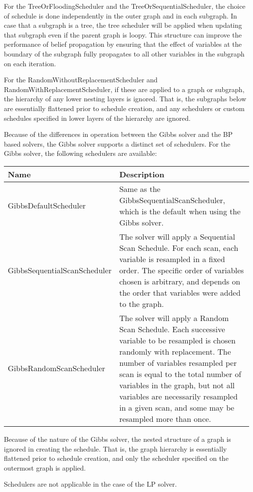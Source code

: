 For the TreeOrFloodingScheduler and the TreeOrSequentialScheduler, the choice of schedule is done independently in the outer graph and in each subgraph.  In case that a subgraph is a tree, the tree scheduler will be applied when updating that subgraph even if the parent graph is loopy.  This structure can improve the performance of belief propagation by ensuring that the effect of variables at the boundary of the subgraph fully propagates to all other variables in the subgraph on each iteration.

For the RandomWithoutReplacementScheduler and RandomWithReplacementScheduler, if these are applied to a graph or subgraph, the hierarchy of any lower nesting layers is ignored.  That is, the subgraphs below are essentially flattened prior to schedule creation, and any schedulers or custom schedules specified in lower layers of the hierarchy are ignored.


Because of the differences in operation between the Gibbs solver and the BP based solvers, the Gibbs solver supports a distinct set of schedulers.  For the Gibbs solver, the following schedulers are available:

\begin{tabular}{l p{4in}}
\textbf{Name} & \textbf{Description} \\ \hline \hline
%
\textsf{GibbsDefaultScheduler} & Same as the GibbsSequentialScanScheduler, which is the default when using the Gibbs solver. \\ \hline
%
\textsf{GibbsSequentialScanScheduler} & The solver will apply a Sequential Scan Schedule.  For each scan, each variable is resampled in a fixed order.  The specific order of variables chosen is arbitrary, and depends on the order that variables were added to the graph. \\ \hline
%
\textsf{GibbsRandomScanScheduler} & The solver will apply a Random Scan Schedule.  Each successive variable to be resampled is chosen randomly with replacement.  The number of variables resampled per scan is equal to the total number of variables in the graph, but not all variables are necessarily resampled in a given scan, and some may be resampled more than once. \\ \hline
%
\end{tabular}

Because of the nature of the Gibbs solver, the nested structure of a graph is ignored in creating the schedule.  That is, the graph hierarchy is essentially flattened prior to schedule creation, and only the scheduler specified on the outermost graph is applied.

Schedulers are not applicable in the case of the LP solver.

